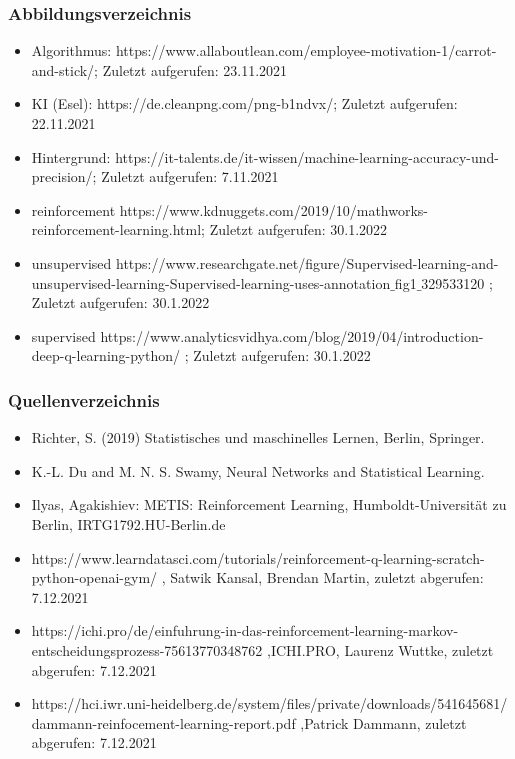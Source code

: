 \documentclass{beamer}
\begin{document}
\begin{frame}%
\frametitle{Abbildungsverzeichnis}
\begin{itemize}
\item Algorithmus: \alert{https://www.allaboutlean.com/employee-motivation-1/carrot-and-stick/}; Zuletzt aufgerufen: 23.11.2021
\item KI (Esel): \alert{https://de.cleanpng.com/png-b1ndvx/}; Zuletzt aufgerufen: 22.11.2021
\item Hintergrund: \alert{https://it-talents.de/it-wissen/machine-learning-accuracy-und-precision/}; Zuletzt aufgerufen: 7.11.2021
\item reinforcement \alert{https://www.kdnuggets.com/2019/10/mathworks-reinforcement-learning.html}; Zuletzt aufgerufen: 30.1.2022
\item unsupervised \alert{https://www.researchgate.net/figure/Supervised-learning-and-unsupervised-learning-Supervised-learning-uses-annotation$\_$fig1$\_$329533120} ; Zuletzt aufgerufen: 30.1.2022
\item supervised \alert{https://www.analyticsvidhya.com/blog/2019/04/introduction-deep-q-learning-python/} ; Zuletzt aufgerufen: 30.1.2022
\end{itemize}
\end{frame}






\begin{frame}%
\frametitle{Quellenverzeichnis}
\begin{itemize}
\item Richter, S. (2019) Statistisches und maschinelles Lernen, Berlin, Springer.
\item K.-L. Du and M. N. S. Swamy, Neural Networks and Statistical Learning.
\item Ilyas, Agakishiev: METIS: Reinforcement Learning, Humboldt-Universität zu Berlin, \alert{IRTG1792.HU-Berlin.de}
\item \alert{https://www.learndatasci.com/tutorials/reinforcement-q-learning-scratch-python-openai-gym/} , Satwik Kansal, Brendan Martin, zuletzt abgerufen: 7.12.2021
\item \alert{https://ichi.pro/de/einfuhrung-in-das-reinforcement-learning-markov-entscheidungsprozess-75613770348762} ,ICHI.PRO, Laurenz Wuttke, zuletzt abgerufen: 7.12.2021
\item \alert{https://hci.iwr.uni-heidelberg.de/system/files/private/downloads/541645681/ dammann-reinfocement-learning-report.pdf} ,Patrick Dammann, zuletzt abgerufen: 7.12.2021
\end{itemize}
\end{frame}
\end{document}
